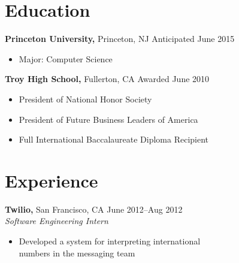 \documentclass[margin]{res}
\begin{document}

\address{{\bf Present Address} \\ 851 California St. Unit 508 \\
  San Francisco, CA 94108 \\ dan@dskang.com }

\address{{\bf Permanent Address} \\ 2507 Cypress Point Drive \\
  Fullerton, CA 92833 }


\begin{resume}

\section{Education}
 {\bf Princeton University,} Princeton, NJ \hfill Anticipated June
 2015
 \begin{itemize} \itemsep -2pt %
 \item Major: Computer Science
 \end{itemize}

 {\bf Troy High School,} Fullerton, CA \hfill Awarded June 2010
 \begin{itemize} \itemsep -2pt %
 \item President of National Honor Society
 \item President of Future Business Leaders of America
 \item Full International Baccalaureate Diploma Recipient
 \end{itemize}

\section{Experience}

 {\bf Twilio,} San Francisco, CA \hfill June 2012--Aug 2012 \\
 {\it Software Engineering Intern}
 \begin{itemize} \itemsep -2pt  %
 \item Developed a system for interpreting international \\
   numbers in the messaging team
 \end{itemize}


\end{resume}
\end{document}
